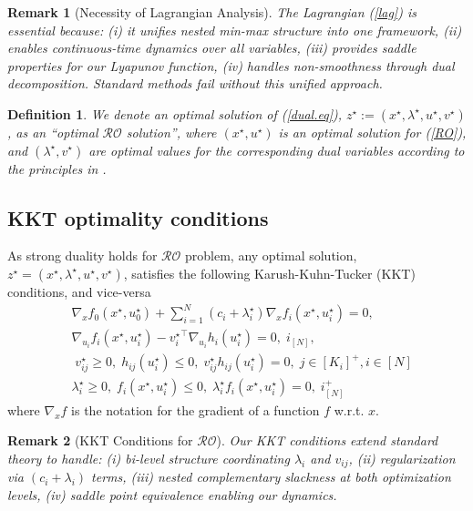 \documentclass[journal,twoside,web]{ieeecolor}
\newcommand{\rev}[1]{\textcolor{revisionblue}{#1}}
\newtheorem{definition}{Definition}
\newtheorem{remark}{Remark}
\begin{document}
\begin{remark}[\rev{Necessity of Lagrangian Analysis}]
\rev{The Lagrangian (\ref{lag}) is essential because: (i) it unifies nested min-max structure into one framework, (ii) enables continuous-time dynamics over all variables, (iii) provides saddle properties for our Lyapunov function, (iv) handles non-smoothness through dual decomposition. Standard methods fail without this unified approach.}
\end{remark}

\begin{definition} \label{optimal_ro}
We denote an optimal solution of (\ref{dual.eq}), $z^\star:=(x^\star,\lambda^\star,u^\star,v^\star)$, as an ``optimal $\mathcal{RO}$ solution'', where $(x^\star, u^\star)$ is an optimal solution for (\ref{RO}), and $(\lambda^\star, v^\star)$ are optimal values for the corresponding dual variables according to the principles in \cite[Section~5.9.1]{boyd2004}.
\end{definition}

\subsection{KKT optimality conditions}

As strong duality holds for $\mathcal{RO}$ problem, any optimal solution, $z^\star=(x^\star,\lambda^\star,u^\star,v^\star)$, satisfies the following Karush-Kuhn-Tucker (KKT) conditions, and vice-versa \cite{boyd2004}
\begin{align}
&\nabla_x f_0(x^\star,u_0^\star)+  \sum_{i=1}^N(c_i+\lambda^\star_i) \nabla_x f_i(x^\star,u_i^\star)=0,\label{kkt1}\\
&\nabla_{u_i} f_i(x^\star,u_i^\star)-{v_i^\star}^\top \nabla_{u_i} h_i(u_i^\star)=0,\; i_ {[N]},\label{kkt2}\\
&\;v_{ij}^\star\geq 0,\; h_{ij}(u_i^\star)\leq 0,\;v_{ij}^\star h_{ij}(u_i^\star)=0,\;  j\in[K_i]^+, i\in[N] \label{kkt3}\\
&\lambda_i^\star\geq 0,\;f_{i}(x^\star,u_i^\star)\leq 0,\;\lambda_i^\star f_{i}(x^\star,u_i^\star)=0,\;i^+_{[N]} \label{kkt4}
\end{align}
where $\nabla_x f$ is the notation for the gradient of a function $f$ w.r.t. $x$.

\begin{remark}[\rev{KKT Conditions for $\mathcal{RO}$}]
\rev{Our KKT conditions extend standard theory \cite{boyd2004} to handle: (i) bi-level structure coordinating $\lambda_i$ and $v_{ij}$, (ii) regularization via $(c_i + \lambda_i)$ terms, (iii) nested complementary slackness at both optimization levels, (iv) saddle point equivalence enabling our dynamics.}
\end{remark}
\end{document}
